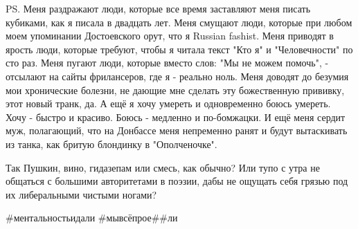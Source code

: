 PS. Меня раздражают люди, которые все время заставляют меня писать кубиками,
как я писала в двадцать лет. Меня смущают люди, которые при любом моем
упоминании Достоевского орут, что я Russian fashist. Меня приводят в ярость
люди, которые требуют, чтобы я читала текст "Кто я" и "Человечности" по сто
раз. Меня пугают люди, которые вместо слов: "Мы не можем помочь", - отсылают на
сайты фрилансеров, где я - реально ноль. Меня доводят до безумия мои
хронические болезни, не дающие мне сделать эту божественную прививку, этот
новый транк, да. А ещё я хочу умереть и одновременно боюсь умереть. Хочу -
быстро и красиво. Боюсь - медленно и по-бомжацки. И ещё меня сердит муж,
полагающий, что на Донбассе меня непременно ранят и будут вытаскивать из танка,
как бритую блондинку в "Ополченочке". 

Так Пушкин, вино, гидазепам или смесь, как обычно? Или тупо с утра не общаться
с большими авторитетами в поэзии, дабы не ощущать себя грязью под их
либеральными чистыми ногами? 

\#ментальностьидали \#мывсёпрое\#\#ли


